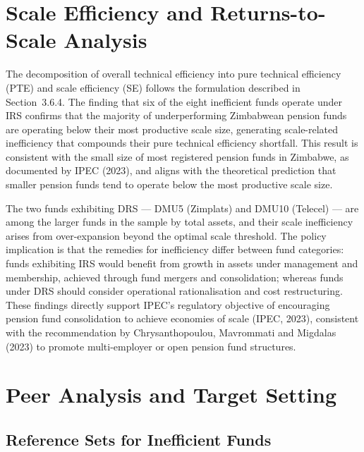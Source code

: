 \documentclass[12pt,a4paper]{article}
\begin{document}
\section{Scale Efficiency and Returns-to-Scale Analysis}

The decomposition of overall technical efficiency into pure technical efficiency (PTE) and scale efficiency (SE) follows the formulation described in Section~3.6.4. The finding that six of the eight inefficient funds operate under IRS confirms that the majority of underperforming Zimbabwean pension funds are operating below their most productive scale size, generating scale-related inefficiency that compounds their pure technical efficiency shortfall. This result is consistent with the small size of most registered pension funds in Zimbabwe, as documented by IPEC (2023), and aligns with the theoretical prediction that smaller pension funds tend to operate below the most productive scale size.

The two funds exhibiting DRS --- DMU5 (Zimplats) and DMU10 (Telecel) --- are among the larger funds in the sample by total assets, and their scale inefficiency arises from over-expansion beyond the optimal scale threshold. The policy implication is that the remedies for inefficiency differ between fund categories: funds exhibiting IRS would benefit from growth in assets under management and membership, achieved through fund mergers and consolidation; whereas funds under DRS should consider operational rationalisation and cost restructuring. These findings directly support IPEC's regulatory objective of encouraging pension fund consolidation to achieve economies of scale (IPEC, 2023), consistent with the recommendation by Chrysanthopoulou, Mavrommati and Migdalas (2023) to promote multi-employer or open pension fund structures.

\section{Peer Analysis and Target Setting}

\subsection{Reference Sets for Inefficient Funds}
\end{document}
